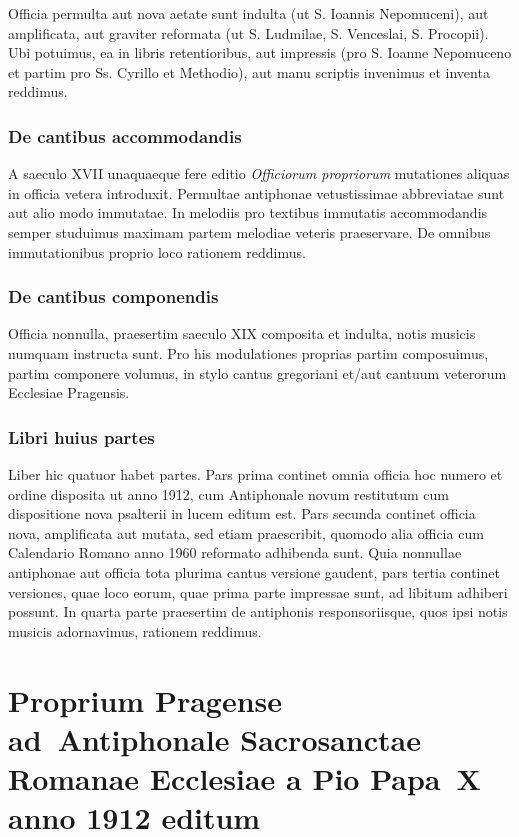 \documentclass[12pt, a5paper, twoside]{book}
\begin{document}
Officia permulta aut nova aetate sunt indulta
(ut S. Ioannis Nepomuceni),
aut amplificata,
aut graviter reformata (ut S. Ludmilae, S. Venceslai, S. Procopii).
Ubi potuimus, ea in libris retentioribus, aut impressis
(pro S. Ioanne Nepomuceno et partim pro Ss. Cyrillo et Methodio),
aut manu scriptis invenimus et inventa reddimus.

\section*{De cantibus accommodandis}
A saeculo XVII unaquaeque fere editio \emph{Officiorum propriorum}
mutationes aliquas in officia vetera introduxit.
Permultae antiphonae vetustissimae abbreviatae sunt aut
alio modo immutatae.
In melodiis pro textibus immutatis accommodandis semper studuimus
maximam partem melodiae veteris praeservare.
De omnibus immutationibus proprio loco rationem reddimus.

\section*{De cantibus componendis}
Officia nonnulla, praesertim saeculo XIX composita et indulta,
notis musicis numquam instructa sunt.
Pro his modulationes proprias partim composuimus,
partim componere volumus, in stylo cantus gregoriani
et/aut cantuum veterorum Ecclesiae Pragensis.

\section*{Libri huius partes}
Liber hic quatuor habet partes.
Pars prima continet omnia officia hoc numero et ordine disposita
ut anno 1912, cum Antiphonale novum restitutum
cum dispositione nova psalterii in lucem editum est.
Pars secunda continet officia nova, amplificata aut mutata,
sed etiam praescribit, quomodo alia officia cum
Calendario Romano anno 1960 reformato adhibenda sunt.
Quia nonnullae antiphonae aut officia tota plurima cantus versione
gaudent, pars tertia continet versiones, quae loco eorum,
quae prima parte impressae sunt, ad libitum adhiberi possunt.
In quarta parte praesertim de antiphonis responsoriisque,
quos ipsi notis musicis adornavimus, rationem reddimus.

\part{Proprium Pragense ad~Antiphonale Sacrosanctae Romanae Ecclesiae
  a Pio Papa~X anno 1912 editum}
\end{document}
